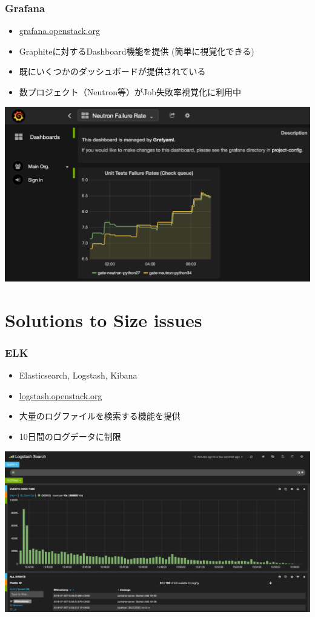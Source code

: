 \documentclass[aspectratio=169,11pt,hyperref={colorlinks=true}]{beamer}
\begin{document}
\begin{frame}
  \frametitle{Grafana}
  \begin{itemize}
    \item \href{http://grafana.openstack.org/}{grafana.openstack.org}
    \item Graphiteに対するDashboard機能を提供 (簡単に視覚化できる)
    \item 既にいくつかのダッシュボードが提供されている
    \item 数プロジェクト（Neutron等）がJob失敗率視覚化に利用中
  \end{itemize}
  \begin{center}
    \includegraphics[width=.7\textwidth]{grafana-sample.png}
  \end{center}
\end{frame}

\section{Solutions to Size issues}
\begin{frame}
  \frametitle{ELK}
  \begin{itemize}
    \item Elasticsearch, Logstash, Kibana
    \item \href{http://logstash.openstack.org}{logstash.openstack.org}
    \item 大量のログファイルを検索する機能を提供
    \item 10日間のログデータに制限
  \end{itemize}
  \begin{center}
    \includegraphics[width=.75\textwidth]{kibana-sample.png}
  \end{center}
\end{frame}
\end{document}
